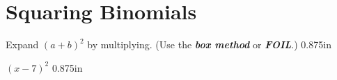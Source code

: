 \section{Squaring Binomials}

\myWideProblem
{
    Expand $(a+b)^2$ by multiplying. 
    (Use the {\bfseries\itshape box method} or {\bfseries\itshape FOIL}.)}
{0.875in}

{
    $(x - 7)^2$
}
{0.875in}
